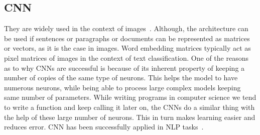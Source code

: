 \subsection{CNN}\label{sec:cnn}
They are widely used in the context of images~\cite{krizhevsky2012imagenet}. Although, the architecture can be used if sentences or paragraphs or documents can be represented as matrices or vectors, as it is the case in images. Word embedding matrices typically act as pixel matrices of images in the context of text classification. One of the reasons as to why CNNs are successful is because of its inherent property of keeping a number of copies of the same type of neurons. This helps the model to have numerous neurons, while being able to process large complex models keeping same number of parameters. While writing programs in computer science we tend to write a function and keep calling it later on, the CNNs do a similar thing with the help of these large number of neurons. This in turn makes learning easier and reduces error. CNN has been successfully applied in NLP tasks~\cite{dos2014deep, zeng2014relation}. 

